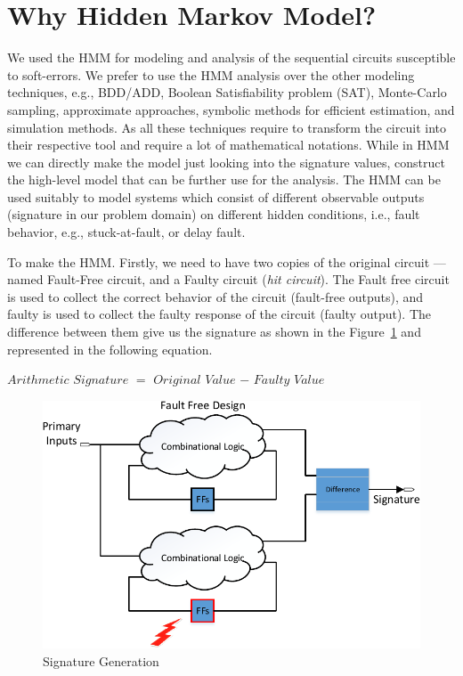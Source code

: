 

\section{Why Hidden Markov Model?}


We used the HMM for modeling and analysis of the sequential circuits susceptible to soft-errors. We prefer to use the HMM analysis over the other modeling techniques, e.g., BDD/ADD, Boolean Satisfiability problem (SAT), Monte-Carlo sampling, approximate approaches, symbolic methods for efficient estimation, and simulation methods. As all these techniques require to transform the circuit into their respective tool and require a lot of mathematical notations. While in HMM we can directly make the model just looking into the signature values, construct the high-level model that can be further use for the analysis. The HMM can be used suitably to model systems which consist of different observable outputs (signature in our problem domain) on different hidden conditions, i.e., fault behavior, e.g., stuck-at-fault, or delay fault.

To make the HMM. Firstly, we need to have two copies of the original circuit --- named Fault-Free circuit, and a Faulty circuit (\textit{hit circuit}). The Fault free circuit is used to collect the correct behavior of the circuit (fault-free outputs), and faulty is used to collect the faulty response of the circuit (faulty output). The difference between them give us the signature as shown in the Figure~\ref{fig:SG} and represented in the following equation.

\begin{center}
$Arithmetic$ $Signature$ $=$ $Original$ $Value$ $-$ $Faulty$ $Value$
\end{center}



 \begin{figure}[tb!]

 \centering
  \captionsetup{justification=centering}    
   \includegraphics[scale=0.8]{Figures/signature1.pdf}
   \caption{Signature Generation}
\label{fig:SG}
\end{figure}





